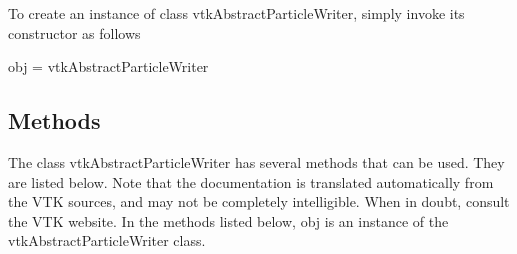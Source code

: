 To create an instance of class vtk\-Abstract\-Particle\-Writer, simply invoke its constructor as follows \begin{DoxyVerb}  obj = vtkAbstractParticleWriter
\end{DoxyVerb}
 \hypertarget{vtkwidgets_vtkxyplotwidget_Methods}{}\subsection{Methods}\label{vtkwidgets_vtkxyplotwidget_Methods}
The class vtk\-Abstract\-Particle\-Writer has several methods that can be used. They are listed below. Note that the documentation is translated automatically from the V\-T\-K sources, and may not be completely intelligible. When in doubt, consult the V\-T\-K website. In the methods listed below, {\ttfamily obj} is an instance of the vtk\-Abstract\-Particle\-Writer class. 
